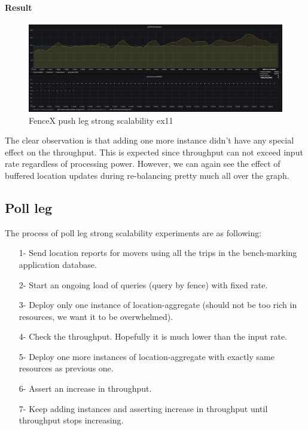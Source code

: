 \documentclass[a4]{report}
\begin{document}
    \paragraph{Result}
    \begin{figure}[ht]
        \caption{FenceX push leg strong scalability ex11}
        \label{fig:ex11}
        \includegraphics[scale=0.4]{images/evaluation/ex11-benchmarking-ongoing-2per4sec.png}
    \end{figure}
    The clear observation is that adding one more instance didn't have any special effect on the throughput.
    This is expected since throughput can not exceed input rate regardless of processing power.
    However, we can again see the effect of buffered location updates during re-balancing pretty much all over the
    graph.

    \subsection{Poll leg}
    The process of poll leg strong scalability experiments are as following:
    \begin{itemize}
        \item[1-] Send location reports for movers using all the trips in the bench-marking application database.
        \item[2-] Start an ongoing load of queries (query by fence) with fixed rate.
        \item[3-] Deploy only one instance of location-aggregate (should not be too rich in resources, we want it to be
        overwhelmed).
        \item[4-] Check the throughput. Hopefully it is much lower than the input rate.
        \item[5-] Deploy one more instances of location-aggregate with exactly same resources as previous one.
        \item[6-] Assert an increase in throughput.
        \item[7-] Keep adding instances and asserting increase in throughput until throughput stops increasing.
    \end{itemize}
\end{document}

